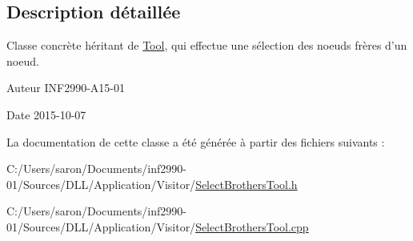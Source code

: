 \subsection{Description détaillée}
Classe concrète héritant de \hyperlink{class_tool}{Tool}, qui effectue une sélection des noeuds frères d'un noeud. 

\begin{DoxyAuthor}{Auteur}
I\-N\-F2990-\/\-A15-\/01 
\end{DoxyAuthor}
\begin{DoxyDate}{Date}
2015-\/10-\/07 
\end{DoxyDate}


La documentation de cette classe a été générée à partir des fichiers suivants \-:\begin{DoxyCompactItemize}
\item 
C\-:/\-Users/saron/\-Documents/inf2990-\/01/\-Sources/\-D\-L\-L/\-Application/\-Visitor/\hyperlink{_select_brothers_tool_8h}{Select\-Brothers\-Tool.\-h}\item 
C\-:/\-Users/saron/\-Documents/inf2990-\/01/\-Sources/\-D\-L\-L/\-Application/\-Visitor/\hyperlink{_select_brothers_tool_8cpp}{Select\-Brothers\-Tool.\-cpp}\end{DoxyCompactItemize}
